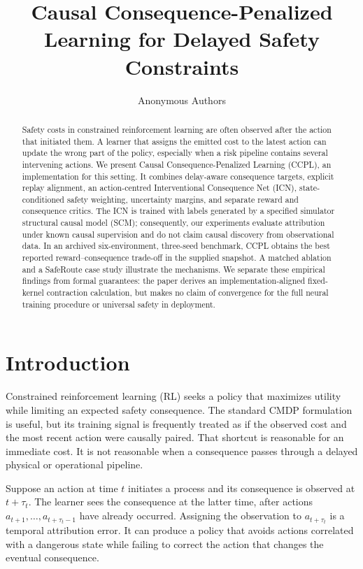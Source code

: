 \documentclass[10pt]{article}
\title{Causal Consequence-Penalized Learning for Delayed Safety Constraints}
\author{Anonymous Authors}
\begin{document}
\maketitle

\begin{abstract}
Safety costs in constrained reinforcement learning are often observed after
the action that initiated them. A learner that assigns the emitted cost to the
latest action can update the wrong part of the policy, especially when a risk
pipeline contains several intervening actions. We present Causal
Consequence-Penalized Learning (CCPL), an implementation for this setting. It
combines delay-aware consequence targets, explicit replay alignment, an
action-centred Interventional Consequence Net (ICN), state-conditioned safety
weighting, uncertainty margins, and separate reward and consequence critics.
The ICN is trained with labels generated by a specified simulator structural
causal model (SCM); consequently, our experiments evaluate attribution under
known causal supervision and do not claim causal discovery from observational
data. In an archived six-environment, three-seed benchmark, CCPL obtains the
best reported reward--consequence trade-off in the supplied snapshot. A
matched ablation and a SafeRoute case study illustrate the mechanisms. We
separate these empirical findings from formal guarantees: the paper derives
an implementation-aligned fixed-kernel contraction calculation, but makes no
claim of convergence for the full neural training procedure or universal
safety in deployment.
\end{abstract}

\section{Introduction}
Constrained reinforcement learning (RL) seeks a policy that maximizes utility
while limiting an expected safety consequence. The standard CMDP formulation
is useful, but its training signal is frequently treated as if the observed
cost and the most recent action were causally paired. That shortcut is
reasonable for an immediate cost. It is not reasonable when a consequence
passes through a delayed physical or operational pipeline.

Suppose an action at time $t$ initiates a process and its consequence is
observed at $t+\tau_t$. The learner sees the consequence at the latter time,
after actions $a_{t+1},\ldots,a_{t+\tau_t-1}$ have already occurred. Assigning
the observation to $a_{t+\tau_t}$ is a temporal attribution error. It can
produce a policy that avoids actions correlated with a dangerous state while
failing to correct the action that changes the eventual consequence.
\end{document}
